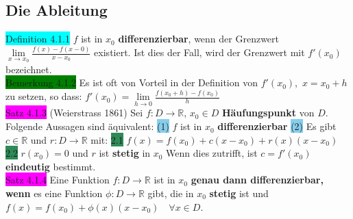 \documentclass[landscape, 10pt]{article}
\newcommand{\R}{\mathbb{R}}
\begin{document}
\begin{multicols}{3}
       \subsection{Die Ableitung}
              \colorbox{cyan}{Definition 4.1.1} 
                     $f$ ist in $x_0$ \textbf{differenzierbar}, 
                     wenn der Grenzwert \textcolor{NavyBlue}{
                     $\lim\limits_{x\to x_0}\frac{f(x)-f(x-0)}{x-x_0}$}
                     existiert. Ist dies der Fall, wird 
                     der Grenzwert mit \textcolor{NavyBlue}{$f'(x_0)$} bezeichnet.\\
              \colorbox{green}{Bemerkung 4.1.2} 
                     Es ist oft von Vorteil in der Definition von 
                     \textcolor{NavyBlue}{$f'(x_0)$},\,
                     \textcolor{NavyBlue}{$x=x_0+h$} zu setzen, so dass: 
                     \textcolor{NavyBlue}{
                     $f'(x_0)=\lim\limits_{h\to 0}\frac{f(x_0+h)-f(x_0)}{h}$}\\
              \colorbox{magenta}{Satz 4.1.3} (Weierstrass 1861) Sei 
                     \textcolor{NavyBlue}{$f:D\longrightarrow\R,\,x_0\in D$}
                     \textbf{Häufungspunkt} von \textcolor{NavyBlue}{$D$}. 
                     Folgende Aussagen sind 
                     äquivalent: 
                     \colorbox{SkyBlue}{(1)} \textcolor{NavyBlue}{$f$} ist in 
                     \textcolor{NavyBlue}{$x_0$} \textbf{differenzierbar} \qquad
                     \colorbox{SkyBlue}{(2)} Es gibt 
                     \textcolor{NavyBlue}{$c\in\R$} und 
                     \textcolor{NavyBlue}{$r:D\longrightarrow\R$} mit: 
                     \colorbox{SeaGreen}{2.1} 
                     \textcolor{NavyBlue}{$f(x)=f(x_0)+c(x-x_0)+r(x)(x-x_0)$} \qquad
                     \colorbox{SeaGreen}{2.2} \textcolor{NavyBlue}{$r(x_0)=0$} und 
                     \textcolor{NavyBlue}{$r$} ist \textbf{stetig} in 
                     \textcolor{NavyBlue}{$x_0$}
                     Wenn dies zutrifft, ist \textcolor{NavyBlue}{$c=f'(x_0)$} 
                     \textbf{eindeutig} bestimmt.\\
              \colorbox{magenta}{Satz 4.1.4} Eine Funktion 
                     \textcolor{NavyBlue}{$f:D\longrightarrow\R$} ist in 
                     $x_0$ \textbf{genau dann differenzierbar, wenn} es eine 
                     Funktion \textcolor{NavyBlue}{$\phi:D\longrightarrow\R$}
                     gibt, die in \textcolor{NavyBlue}{$x_0$} \textbf{stetig} ist 
                     und \textcolor{NavyBlue}{$f(x)=f(x_0)+\phi(x)(x-x_0)\quad\forall x\in D$}. 

\end{multicols}
\end{document}
